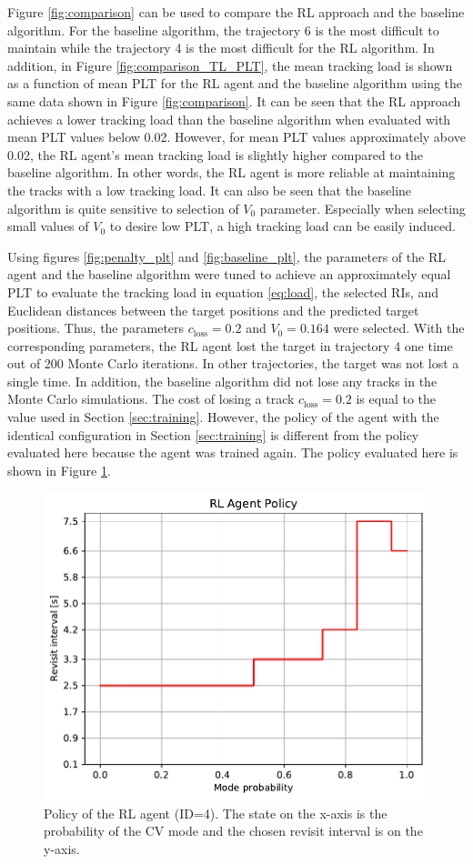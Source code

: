 \documentclass[english, 12pt, a4paper, elec, utf8, a-1b, online]{aaltothesis}
\numberwithin{equation}{section}
\newcommand{\closs}{c_\text{loss}}
\begin{document}
Figure \ref{fig:comparison} can be used to compare the RL approach and the baseline algorithm.
For the baseline algorithm, the trajectory 6 is the most difficult to maintain while the trajectory 4 is the most difficult for the RL algorithm.
In addition, in Figure \ref{fig:comparison_TL_PLT}, the mean tracking load is shown as a function of mean PLT for the RL agent and the baseline algorithm using the same data shown in Figure \ref{fig:comparison}. 
It can be seen that the RL approach achieves a lower tracking load than the baseline algorithm when evaluated with mean PLT values below 0.02. 
However, for mean PLT values approximately above 0.02, the RL agent's mean tracking load is slightly higher compared to the baseline algorithm. 
In other words, the RL agent is more reliable at maintaining the tracks with a low tracking load. 
It can also be seen that the baseline algorithm is quite sensitive to selection of $V_0$ parameter. 
Especially when selecting small values of $V_0$ to desire low PLT, a high tracking load can be easily induced.


Using figures \ref{fig:penalty_plt} and \ref{fig:baseline_plt}, the parameters of the RL agent and the baseline algorithm were tuned to achieve an approximately equal PLT to evaluate the tracking load in equation \eqref{eq:load}, the selected RIs, and Euclidean distances between the target positions and the predicted target positions.
Thus, the parameters $\closs = 0.2$ and $V_0=0.164$ were selected.
With the corresponding parameters, the RL agent lost the target in trajectory 4 one time out of 200 Monte Carlo iterations. 
In other trajectories, the target was not lost a single time.
In addition, the baseline algorithm did not lose any tracks in the Monte Carlo simulations.
The cost of losing a track $\closs=0.2$ is equal to the value used in Section \ref{sec:training}.
However, the policy of the agent with the identical configuration in Section \ref{sec:training} is different from the policy evaluated here because the agent was trained again.
The policy evaluated here is shown in Figure \ref{fig:policy_id4}.

\begin{figure}[tb]
    \centering
    \includegraphics[width=.8\linewidth]{figures/benchmark/Training/policy.pdf}
    \caption{Policy of the RL agent (ID=4). The state on the x-axis is the probability of the CV mode and the chosen revisit interval is on the y-axis.}
    \label{fig:policy_id4}
\end{figure}
\end{document}
